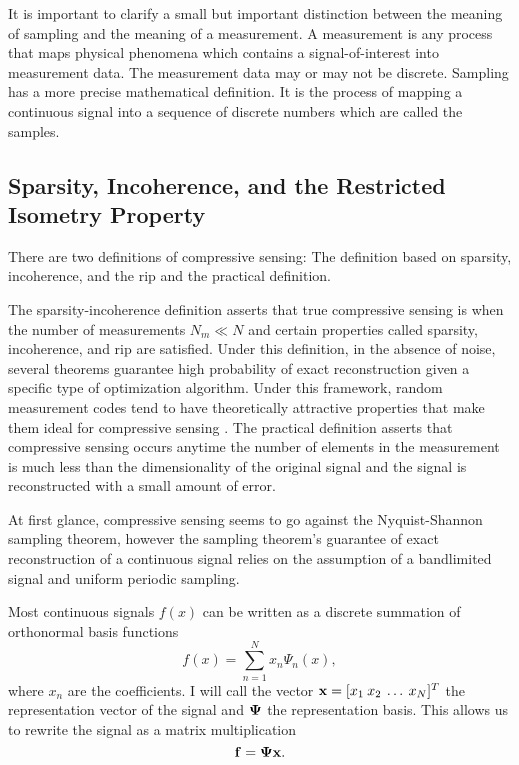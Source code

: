 It is important to clarify a small but important distinction between the meaning of \gls{sampling} and the meaning of a \gls{measurement}. A measurement is any process that maps physical phenomena which contains a signal-of-interest into measurement data. The measurement data may or may not be discrete. Sampling has a more precise mathematical definition. It is the process of mapping a continuous signal into a sequence of discrete numbers which are called the samples. 

\subsection{Sparsity, Incoherence, and the Restricted Isometry Property}

There are two definitions of compressive sensing: The definition based on sparsity, incoherence, and the \gls{rip} and the practical definition.

The sparsity-incoherence definition asserts that true compressive sensing is when the number of measurements $N_m \ll N$ and certain properties called sparsity, incoherence, and \gls{rip} are satisfied. Under this definition, in the absence of noise, several theorems guarantee high probability of exact reconstruction given a specific type of optimization algorithm. Under this framework, random measurement codes tend to have theoretically attractive properties that make them ideal for \gls{compressive sensing} \cite{candes2005l1, candes2006robust, foucart2013mathematical, candes2008introduction}. The practical definition asserts that compressive sensing occurs anytime the number of elements in the measurement is much less than the dimensionality of the original signal and the signal is reconstructed with a small amount of error. 

At first glance, \gls{compressive sensing} seems to go against the Nyquist-Shannon sampling theorem, however the sampling theorem's guarantee of exact reconstruction of a continuous signal relies on the assumption of a bandlimited signal and uniform periodic sampling.

Most continuous signals $f(x)$ can be written as a discrete summation of orthonormal basis functions
\begin{equation}
	f(x) = \sum_{n=1}^{N} x_n \Psi_n(x),
	\label{eq:expansionEquation1}
\end{equation}
where $x_n$ are the coefficients. I will call the vector $\mathbf{x} = [ x_{1} \: x_{2} \: \dots \: x_{N} ]^T$ the representation vector of the signal and $\mathbf{\Psi}$ the representation basis. This allows us to rewrite the signal as a matrix multiplication
\begin{equation}
	\mathbf{f} = \mathbf{\Psi}\mathbf{x}.
\end{equation}

